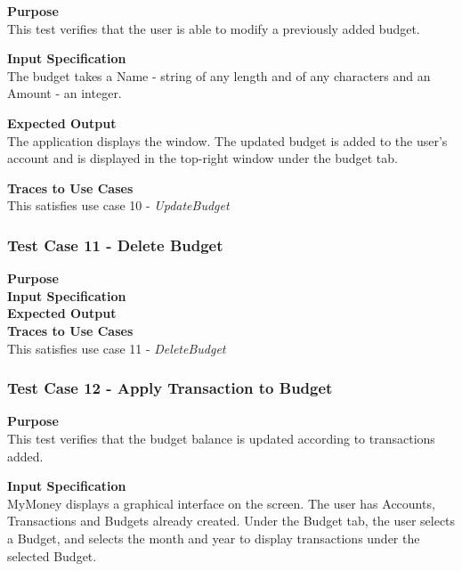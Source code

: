 \documentclass[12pt]{article}
\begin{document}
{\bf Purpose}\\
This test verifies that the user is able to modify a previously added budget.                  

{\bf Input Specification}\\
The budget takes a Name - string of any length and of any characters
and an Amount - an integer.

\noindent
{\bf Expected Output}\\
The application displays the window.
The updated budget is added to the user's account and is displayed in the top-right window
under the budget tab.

\noindent
{\bf Traces to Use Cases}\\
This satisfies use case 10 - \textit{UpdateBudget}


\subsubsection{Test Case 11 - Delete Budget} \label{TC-11}
\noindent
{\bf Purpose}\\
                                        
\noindent
{\bf Input Specification}\\

\noindent
{\bf Expected Output}\\

\noindent
{\bf Traces to Use Cases}\\
This satisfies use case 11 - \textit{DeleteBudget}

\subsubsection{Test Case 12 - Apply Transaction to Budget} \label{TC-12}
\noindent
{\bf Purpose}\\
This test verifies that the budget balance is updated according to transactions added.
                                                        
\noindent
{\bf Input Specification}\\
MyMoney displays a graphical interface on the screen. The user has Accounts, Transactions and Budgets already created. Under the Budget tab, the user selects a Budget, and selects the month and year to display transactions under the selected Budget.
\end{document}
